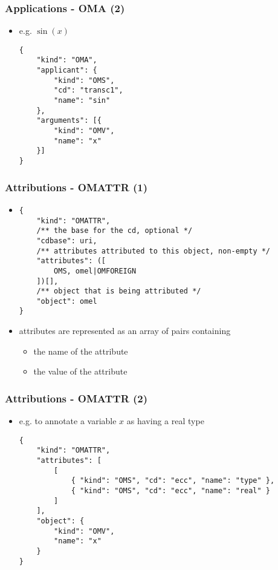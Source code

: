 \documentclass[usenames,dvipsnames]{beamer}
\begin{document}
\begin{frame}[fragile]
    \frametitle{Applications - OMA (2)}
    \begin{itemize}
        \item e.g. $\sin(x)$ \begin{lstlisting}
{
    "kind": "OMA",
    "applicant": {
        "kind": "OMS",
        "cd": "transc1",
        "name": "sin"
    },
    "arguments": [{
        "kind": "OMV",
        "name": "x"
    }]
}
\end{lstlisting}
    \end{itemize}
\end{frame}

\begin{frame}[fragile]
    \frametitle{Attributions - OMATTR (1)}
    \begin{itemize}
        \item
        \begin{lstlisting}
{
    "kind": "OMATTR", 
    /** the base for the cd, optional */
    "cdbase": uri, 
    /** attributes attributed to this object, non-empty */
    "attributes": ([
        OMS, omel|OMFOREIGN
    ])[],
    /** object that is being attributed */
    "object": omel
}
    \end{lstlisting}
        \item attributes are represented as an array of pairs containing
        \begin{itemize}
            \item the name of the attribute
            \item the value of the attribute
        \end{itemize}
    \end{itemize}
\end{frame}

\begin{frame}[fragile]
    \frametitle{Attributions - OMATTR (2)}
    \begin{itemize}
        \item e.g. to annotate a variable $x$ as having a real type
\begin{lstlisting}
{
    "kind": "OMATTR",
    "attributes": [
        [
            { "kind": "OMS", "cd": "ecc", "name": "type" },
            { "kind": "OMS", "cd": "ecc", "name": "real" }
        ]
    ],
    "object": {
        "kind": "OMV",
        "name": "x"
    }
}
\end{lstlisting}
    \end{itemize}
\end{frame}
\end{document}
